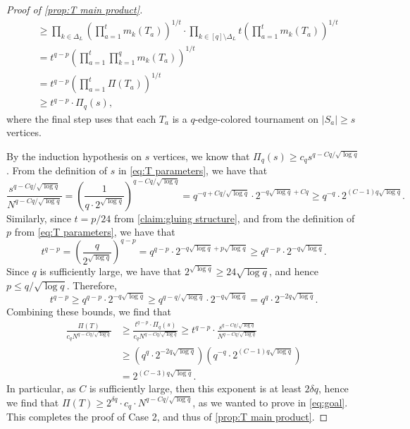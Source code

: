 \documentclass[11pt,reqno]{amsart}
\theoremstyle{definition}
\newcommand\ab[1]{\lvert#1\rvert}
\newcommand\1{\mathbf{1}}
\let\leq\leqslant
\let\geq\geqslant
\begin{document}
\begin{proof}[Proof of \cref{prop:T main product}]
\begin{align*}
        &\geq \prod_{k\in \Delta_L} \left( \prod_{a=1}^t m_k(T_a) \right)^{1/t} \cdot \prod_{k\in [q]\setminus \Delta_L} t \left( \prod_{a=1}^t m_k(T_a) \right)^{1/t}\\
        &= t^{q-p} \left( \prod_{a=1}^t \prod_{k=1}^q m_k(T_a) \right)^{1/t}\\
        &=t^{q-p} \left( \prod_{a=1}^t \Pi(T_a) \right)^{1/t}\\
        &\geq t^{q-p}\cdot \Pi_q(s),
    \end{align*}
    where the final step uses that each $T_a$ is a $q$-edge-colored tournament on $\ab{S_a}\geq s$ vertices.

    By the induction hypothesis on $s$ vertices, we know that $\Pi_q(s) \geq c_q s^{q-Cq/\sqrt{\log q}}$. From the definition of $s$ in \eqref{eq:T parameters}, we have that
    \[
        \frac{s^{q-Cq/\sqrt{\log q}}}{N^{q-Cq/\sqrt{\log q}}} = \left( \frac{1}{q\cdot 2^{\sqrt{\log q}}} \right)^{q-Cq/\sqrt{\log q}} = q^{-q+Cq/\sqrt{\log q}} \cdot 2^{-q\sqrt{\log q}+Cq} \geq q^{-q} \cdot 2^{(C-1)q\sqrt{\log q}}.
    \]
    Similarly, since $t=p/24$ from \cref{claim:gluing structure}, and from the definition of $p$ from \eqref{eq:T parameters}, we have that
    \[
        t^{q-p} = \left( \frac{q}{2^{\sqrt{\log q}}} \right)^{q-p} =q^{q-p} \cdot 2^{-q \sqrt{\log q}+p\sqrt{\log q}} \geq q^{q-p} \cdot 2^{-q\sqrt{\log q}}.
    \]
    Since $q$ is sufficiently large, we have that $2^{\sqrt{\log q}}\geq 24\sqrt{\log q}$, and hence $p \leq q/\sqrt{\log q}$. Therefore,
    \[
        t^{q-p}\geq q^{q-p} \cdot 2^{-q\sqrt{\log q}} \geq q^{q-q/\sqrt{\log q}} \cdot 2^{-q\sqrt{\log q}}=q^q \cdot 2^{-2q\sqrt{\log q}}. 
    \]
    Combining these bounds, we find that
    \begin{align*}
        \frac{\Pi(T)}{c_q N^{q-Cq/\sqrt{\log q}}} &\geq \frac{t^{q-p}\cdot \Pi_q(s)}{c_q N^{q-Cq/\sqrt{\log q}}} \geq t^{q-p}\cdot \frac{s^{q-Cq/\sqrt{\log q}}}{N^{q-Cq/\sqrt{\log q}}}\\
        &\geq \left( q^q \cdot 2^{-2q \sqrt{\log q}} \right) \left( q^{-q} \cdot 2^{(C-1)q\sqrt{\log q}} \right)\\
        &= 2^{(C-3)q\sqrt{\log q}}. 
    \end{align*}
    In particular, as $C$ is sufficiently large, then this exponent is at least $2\delta q$, hence we find that $\Pi(T) \geq 2^{\delta q}\cdot c_q\cdot N^{q-Cq/\sqrt{\log q}}$, as we wanted to prove in \eqref{eq:goal}. This completes the proof of Case 2, and thus of \cref{prop:T main product}.
\end{proof}
\end{document}
